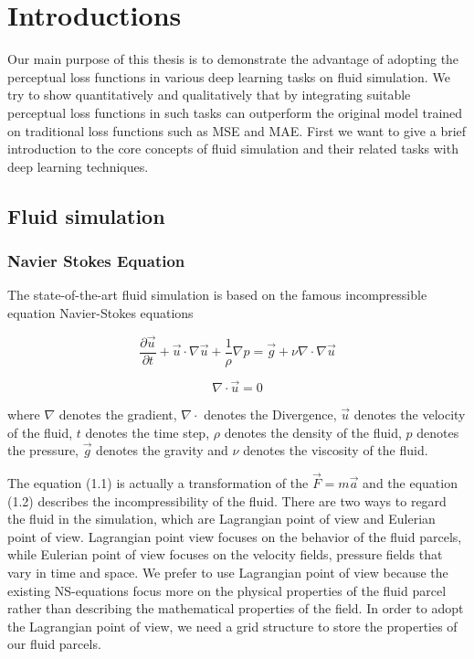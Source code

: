 \documentclass[a4paper,12pt,twoside]{report}
\begin{document}
\chapter{Introductions}

Our main purpose of this thesis is to demonstrate the advantage of adopting the perceptual loss functions in various deep learning tasks on fluid simulation. We try to show quantitatively and qualitatively that by integrating suitable perceptual loss functions in such tasks can outperform the original model trained on traditional loss functions such as MSE and MAE.  First we want to give a brief introduction to the core concepts of fluid simulation and their related tasks with deep learning techniques.
\section{Fluid simulation}
\subsection{Navier Stokes Equation}
The state-of-the-art fluid simulation is based on the famous incompressible equation Navier-Stokes equations

\begin{equation}
\frac{\partial \vec u}{\partial t}+\vec u\cdot \nabla\vec u+\frac1\rho\nabla p = \vec g + \nu\nabla\cdot\nabla\vec{u}
\end{equation}

\begin{equation}
{\nabla}\cdot\vec{u} = 0
\end{equation}

where $\nabla$ denotes the gradient, $\nabla\cdot$ denotes the Divergence, $\vec{u}$ denotes the velocity of the fluid, $t$ denotes the time step, $\rho$ denotes the density of the fluid, $p$ denotes the pressure, $\vec{g}$ denotes the gravity and $\nu$ denotes the viscosity of the fluid.

The equation (1.1) is actually a transformation of the $\vec{F} = m\vec{a}$ and the equation (1.2) describes the incompressibility of the fluid. There are two ways to regard the fluid in the simulation, which are Lagrangian point of view and Eulerian point of  view. Lagrangian point view focuses on the behavior of the fluid parcels, while Eulerian point of view focuses on the velocity fields, pressure fields that vary in time and space. We prefer to use Lagrangian point of view because the existing NS-equations focus more on the physical properties of the fluid parcel rather than describing the mathematical properties of the field.  In order to adopt the Lagrangian point of view, we need a grid structure to store the properties of our fluid parcels.
\end{document}
